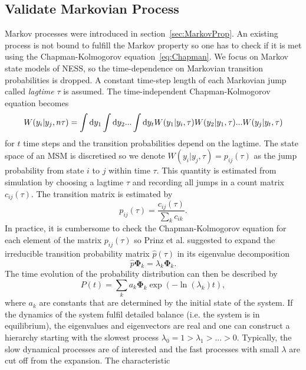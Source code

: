 \subsection{Validate Markovian Process}
\label{sec:validate}
Markov processes were introduced in section~\ref{sec:MarkovProp}. An existing process is not bound to fulfill the Markov property so one has to check if it is met using the Chapman-Kolmogorov equation~\ref{eq:Chapman}. We focus on Markov state models of NESS, so the time-dependence on Markovian transition probabilities is dropped. A constant time-step length of each Markovian jump called \textit{lagtime} $\tau$ is assumed. The time-independent Chapman-Kolmogorov equation becomes
\begin{equation}
W(y_i | y_j , n \tau) = \int \mathop{}\!\mathrm{d} y_1 \int \mathop{}\!\mathrm{d} y_2 ... \int \mathop{}\!\mathrm{d} y_{t}  W(y_1 | y_i , \tau) W(y_2 | y_1 , \tau) ...  W(y_j | y_{t} , \tau)
\end{equation}
for $t$ time steps and the transition probabilities depend on the lagtime. The state space of an MSM is discretised so we denote $W(y_i | y_j , \tau) = p_{ij}(\tau)$ as the jump probability from state $i$ to $j$ within time $\tau$. This quantity is estimated from simulation by choosing a lagtime $\tau$ and recording all jumps in a count matrix $c_{ij}(\tau)$. The transition matrix is estimated by
\begin{equation}
 p_{ij}(\tau) = \frac{c_{ij}(\tau)}{\sum_k c_{ik}}.
\end{equation}
In practice, it is cumbersome to check the Chapman-Kolmogorov equation for each element of the matrix $p_{ij}(\tau)$ so Prinz et al. \cite{prinz2011markov} suggested to expand the irreducible transition probability matrix $\hat p(\tau)$ in its eigenvalue decomposition
\begin{equation}
\hat p \boldsymbol{\Phi}_k = \lambda_k \boldsymbol{\Phi}_k .
\end{equation}
The time evolution of the probability distribution can then be described by 
\begin{equation}
 P(t) = \sum_k a_k \boldsymbol{\Phi}_k \exp \left ( -\ln (\lambda_k) t \right ),
 \label{eq:expansion}
\end{equation} 
where $a_k$ are constants that are determined by the initial state of the system. If the dynamics of the system fulfil detailed balance (i.e. the system is in equilibrium), the eigenvalues and eigenvectors are real and one can construct a hierarchy starting with the slowest process $\lambda_0 = 1 > \lambda_1 > ... > 0 $. Typically, the slow dynamical processes are of interested and the fast processes with small $\lambda$ are cut off from the expansion. The characteristic

